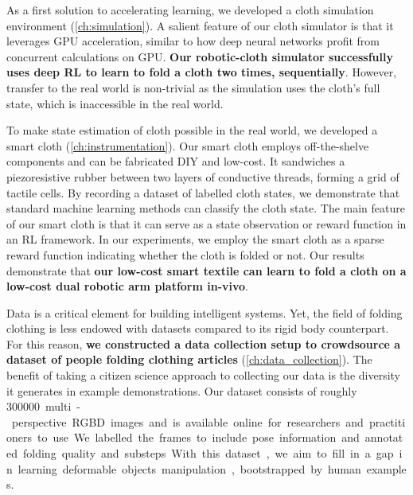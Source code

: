 \documentclass[\home/main.tex]{subfiles}
\begin{document}
As a first solution to accelerating learning, we developed a cloth simulation environment (\cref{ch:simulation}). A salient feature of our cloth simulator is that it leverages \gls{GPU} acceleration, similar to how deep neural networks profit from concurrent calculations on \gls{GPU}. \textbf{Our robotic-cloth simulator successfully uses deep \gls{RL} to learn to fold a cloth two times, sequentially}. However, transfer to the real world is non-trivial as the simulation uses the cloth's full state, which is inaccessible in the real world.

To make state estimation of cloth possible in the real world, we developed a smart cloth (\cref{ch:instrumentation}). Our smart cloth employs off-the-shelve components and can be fabricated DIY and low-cost. It sandwiches a piezoresistive rubber between two layers of conductive threads, forming a grid of tactile cells. By recording a dataset of labelled cloth states, we demonstrate that standard machine learning methods can classify the cloth state. The main feature of our smart cloth is that it can serve as a state observation or reward function in an RL framework. In our experiments, we employ the smart cloth as a sparse reward function indicating whether the cloth is folded or not. Our results demonstrate that \textbf{our low-cost smart textile can learn to fold a cloth on a low-cost dual robotic arm platform in-vivo}.

Data is a critical element for building intelligent systems. Yet, the field of folding clothing is less endowed with datasets compared to its rigid body counterpart. For this reason, \textbf{we constructed a data collection setup to crowdsource a dataset of people folding clothing articles} (\cref{ch:data_collection}). The benefit of taking a citizen science approach to collecting our data is the diversity it generates in example demonstrations. Our dataset consists of roughly \qty{300000} multi-perspective RGBD images and is available online for researchers and practitioners to use. We labelled the frames to include pose information and annotated folding quality and substeps. With this dataset, we aim to fill in a gap in learning deformable objects manipulation, bootstrapped by human examples.
\end{document}
